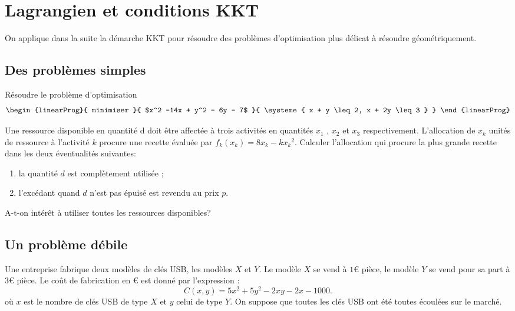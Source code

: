 \documentclass[11pt, a4paper]{article}
\begin{document}
\section{Lagrangien et conditions KKT}
\label{sec:lagrangien}

On applique dans la suite la démarche KKT pour résoudre des problèmes
d'optimisation plus délicat à résoudre géométriquement.

\subsection{Des problèmes simples}

\begin{question}
  Résoudre le problème d'optimisation
  \[
  \begin{linearProg}{
      minimiser
    }{
      $x^2 -14x + y^2 - 6y - 7$
    }{
      \systeme{
        x + y \leq 2,
        x + 2y \leq 3
      }
    }
  \end{linearProg}
  \]
\end{question}

\begin{question}
  Une ressource disponible en quantité d doit être affectée à trois
  activités en quantités $x_1$ , $x_2$ et $x_3$
  respectivement. L’allocation de $x_k$ unités de ressource à
  l’activité $k$ procure une recette évaluée par
  $f_k(x_k) = 8x_k - k{x_k}^2$. Calculer l'allocation qui procure la
  plus grande recette dans les deux éventualités suivantes:
  \begin{enumerate}
  \item la quantité $d$ est complètement utilisée ;
  \item l'excédant quand $d$ n'est pas épuisé est revendu au prix $p$.
  \end{enumerate}
  A-t-on intérêt à utiliser toutes les ressources disponibles?
\end{question}

\subsection{Un problème débile}

Une entreprise fabrique deux modèles de clés USB, les modèles $X$ et
$Y$. Le modèle $X$ se vend à $1$\euro{} pièce, le modèle $Y$ se vend pour
sa part à $3$\euro{} pièce. Le coût de fabrication en \euro{} est donné par
l'expression :
\[
C(x, y) = 5x^2 + 5y^2 - 2xy - 2x - 1000.
\]
où $x$ est le nombre de clés USB de type $X$ et $y$ celui de type
$Y$. On suppose que toutes les clés USB ont été toutes écoulées sur le
marché.
\end{document}

